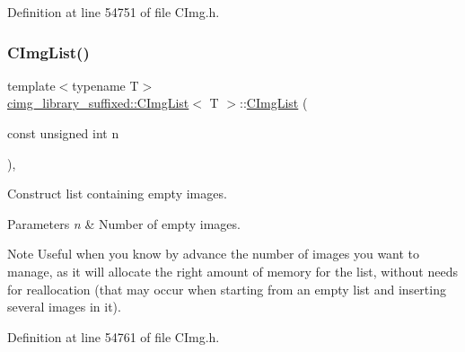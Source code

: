 Definition at line 54751 of file C\+Img.\+h.

\mbox{\label{structcimg__library__suffixed_1_1CImgList_abf01d78f440ac4203e4d4055ac7b810b}} 
\subsubsection{\texorpdfstring{C\+Img\+List()}{CImgList()}\hspace{0.1cm}{\footnotesize\ttfamily [2/19]}}
{\footnotesize\ttfamily template$<$typename T$>$ \\
\hyperlink{structcimg__library__suffixed_1_1CImgList}{cimg\+\_\+library\+\_\+suffixed\+::\+C\+Img\+List}$<$ T $>$\+::\hyperlink{structcimg__library__suffixed_1_1CImgList}{C\+Img\+List} (\begin{DoxyParamCaption}\item[{const unsigned int}]{n }\end{DoxyParamCaption})\hspace{0.3cm}{\ttfamily [inline]}, {\ttfamily [explicit]}}



Construct list containing empty images. 


\begin{DoxyParams}{Parameters}
{\em n} & Number of empty images. \\
\hline
\end{DoxyParams}
\begin{DoxyNote}{Note}
Useful when you know by advance the number of images you want to manage, as it will allocate the right amount of memory for the list, without needs for reallocation (that may occur when starting from an empty list and inserting several images in it). 
\end{DoxyNote}


Definition at line 54761 of file C\+Img.\+h.

\mbox{\label{structcimg__library__suffixed_1_1CImgList_a0b0ca855289f84488b25862ebc283e56}} 
